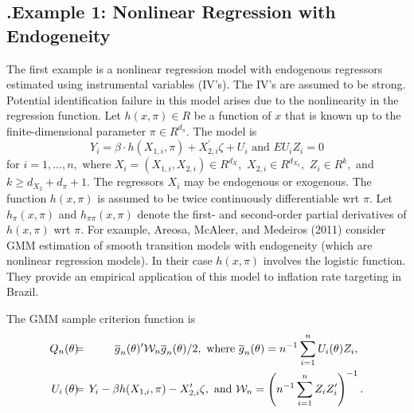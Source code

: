 \documentclass[12pt,thmsb,titlepage,final,oneside,letterpaper]{article}
\begin{document}
\subsection{\hspace{-0.2in}\textbf{.}\hspace{0.18in}Example 1: Nonlinear
Regression with Endogeneity}

\hspace{0.25in}The first example is a nonlinear regression model with
endogenous regressors estimated using instrumental variables (IV's). The
IV's are assumed to be strong. Potential identification failure in this
model arises due to the nonlinearity in the regression function. Let $%
h(x,\pi )\in R$ be a function of $x$ that is known up to the
finite-dimensional parameter $\pi \in R^{d_{\pi }}.$ The model is%
\begin{equation}
Y_{i}=\beta \cdot h\left( X_{1,i},\pi \right) +X_{2,i}^{\prime }\zeta +U_{i}%
\text{ and }EU_{i}Z_{i}=0
\end{equation}%
for $i=1,...,n,$ where $X_{i}=(X_{1,i},X_{2,i})\in R^{d_{X}},$ $X_{2,i}\in
R^{d_{X_{2}}},$ $Z_{i}\in R^{k},$ and $k\geq d_{X_{2}}+d_{\pi }+1.$ The
regressors $X_{i}$ may be endogenous or exogenous. The function $h(x,\pi )$
is assumed to be twice continuously differentiable wrt $\pi .$ Let $h_{\pi
}(x,\pi )$ and $h_{\pi \pi }(x,\pi )$ denote the first- and second-order
partial derivatives of $h(x,\pi )$ wrt $\pi .$ For example, Areosa, McAleer,
and Medeiros (2011) consider GMM estimation of smooth transition models with
endogeneity (which are nonlinear regression models). In their case $h(x,\pi
) $ involves the logistic function. They provide an empirical application of
this model to inflation rate targeting in Brazil.

The GMM sample criterion function is%
\begin{eqnarray}
Q_{n}(\theta )\hspace{-0.08in} &=&\hspace{-0.08in}\overline{g}_{n}(\theta
)^{\prime }\mathcal{W}_{n}\overline{g}_{n}(\theta )/2,\text{ where }%
\overline{g}_{n}(\theta )=n^{-1}\sum_{i=1}^{n}U_{i}(\theta )Z_{i},\text{ } 
\notag \\
U_{i}\left( \theta \right) \hspace{-0.08in} &=&\hspace{-0.08in}Y_{i}-\beta
h(X_{1,i},\pi )-X_{2,i}^{\prime }\zeta ,\text{ and }\mathcal{W}_{n}=\left(
n^{-1}\sum_{i=1}^{n}Z_{i}Z_{i}^{\prime }\right) ^{-1}.  \label{gmm CF}
\end{eqnarray}
\end{document}
